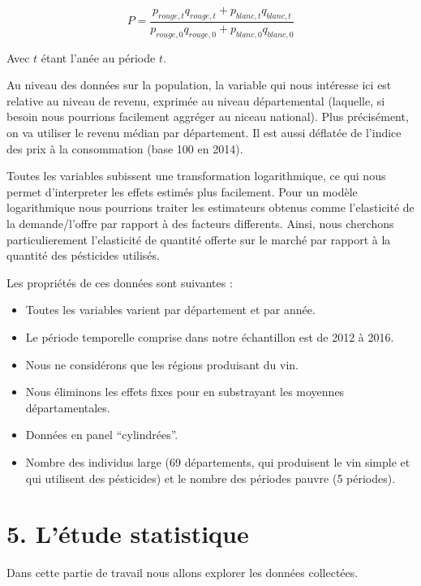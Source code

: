 \documentclass[11pt,]{article}
\providecommand{\tightlist}{%
  \setlength{\itemsep}{0pt}\setlength{\parskip}{0pt}}
\begin{document}
\begin{equation*}
  P = \frac{p_{rouge, t} q_{rouge, t} + p_{blanc, t} q_{blanc, t}}{p_{rouge, 0} q_{rouge, 0} + p_{blanc, 0} q_{blanc, 0}}
\end{equation*}

Avec \(t\) étant l'anée au période \(t\).

Au niveau des données sur la population, la variable qui nous intéresse
ici est relative au niveau de revenu, exprimée au niveau départemental
(laquelle, si besoin nous pourrions facilement aggréger au niceau
national). Plus précisément, on va utiliser le revenu médian par
département. Il est aussi déflatée de l'indice des prix à la
consommation (base 100 en 2014).

Toutes les variables subissent une transformation logarithmique, ce qui
nous permet d'interpreter les effets estimés plus facilement. Pour un
modèle logarithmique nous pourrions traiter les estimateurs obtenus
comme l'elasticité de la demande/l'offre par rapport à des facteurs
differents. Ainsi, nous cherchons particulierement l'elasticité de
quantité offerte sur le marché par rapport à la quantité des pésticides
utilisés.

Les propriétés de ces données sont suivantes :

\begin{itemize}
\tightlist
\item
  Toutes les variables varient par département et par année.
\item
  Le période temporelle comprise dans notre échantillon est de 2012 à
  2016.
\item
  Nous ne considérons que les régions produisant du vin.
\item
  Nous éliminons les effets fixes pour en substrayant les moyennes
  départamentales.
\item
  Données en panel ``cylindrées''.
\item
  Nombre des individus large (69 départements, qui produisent le vin
  simple et qui utilisent des pésticides) et le nombre des périodes
  pauvre (5 périodes).
\end{itemize}

\hypertarget{letude-statistique}{%
\section{5. L'étude statistique}\label{letude-statistique}}

Dans cette partie de travail nous allons explorer les données
collectées.
\end{document}
